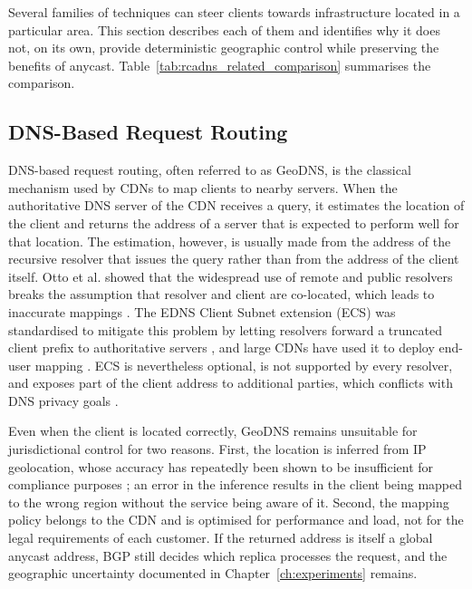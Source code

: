 \documentclass[
A4paper,                %
twoside,                %
openright,              %
chapterprefix=true,     %
12pt,                   %
headings=normal,        %
titlepage=on            %
]{book}
\begin{document}
Several families of techniques can steer clients towards infrastructure located in a particular area. This section describes each of them and identifies why it does not, on its own, provide deterministic geographic control while preserving the benefits of anycast. Table~\ref{tab:rcadns_related_comparison} summarises the comparison.

\subsection{DNS-Based Request Routing}
\label{sc:rcadns_related_geodns}

DNS-based request routing, often referred to as GeoDNS, is the classical mechanism used by CDNs to map clients to nearby servers. When the authoritative DNS server of the CDN receives a query, it estimates the location of the client and returns the address of a server that is expected to perform well for that location. The estimation, however, is usually made from the address of the recursive resolver that issues the query rather than from the address of the client itself. Otto et al. showed that the widespread use of remote and public resolvers breaks the assumption that resolver and client are co-located, which leads to inaccurate mappings \cite{Otto2012ContentSolutions}. The EDNS Client Subnet extension (ECS) was standardised to mitigate this problem by letting resolvers forward a truncated client prefix to authoritative servers \cite{Contavalli2016ClientQueries}, and large CDNs have used it to deploy end-user mapping \cite{Chen2015End-UserDelivery}. ECS is nevertheless optional, is not supported by every resolver, and exposes part of the client address to additional parties, which conflicts with DNS privacy goals \cite{Bortzmeyer2015DNSConsiderations}.

Even when the client is located correctly, GeoDNS remains unsuitable for jurisdictional control for two reasons. First, the location is inferred from IP geolocation, whose accuracy has repeatedly been shown to be insufficient for compliance purposes \cite{Poese2011IPUnreliable, Cozar2022ReliabilityTransfers}; an error in the inference results in the client being mapped to the wrong region without the service being aware of it. Second, the mapping policy belongs to the CDN and is optimised for performance and load, not for the legal requirements of each customer. If the returned address is itself a global anycast address, BGP still decides which replica processes the request, and the geographic uncertainty documented in Chapter~\ref{ch:experiments} remains.
\end{document}
